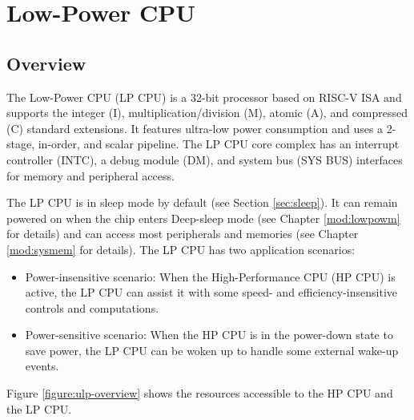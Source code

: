 \documentclass[main\_\_EN.tex]{subfiles}
\begin{document}
\setenglishformatting

\ifglobal
\else
    \clearpage
    \listoftodos
    \listofdonetodos
    \tableofcontents
\fi



\hypertarget{ulp}{}
\chapter{Low-Power CPU}
\label{mod:ulp}

\section{Overview}
\label{sec:ulp-intro}

The \chipname{} Low-Power CPU (LP CPU) is a 32-bit processor based on RISC-V ISA and supports the integer (I), multiplication/division (M), atomic (A), and compressed (C) standard extensions. It features ultra-low power consumption and uses a 2-stage, in-order, and scalar pipeline. The LP CPU core complex has an interrupt controller (INTC), a debug module (DM), and system bus (SYS BUS) interfaces for memory and peripheral access.

The LP CPU is in sleep mode by default (see Section \ref{sec:sleep}). It can remain powered on when the chip enters Deep-sleep mode (see Chapter \ref{mod:lowpowm} \textit{} for details) and can access most peripherals and memories (see Chapter \ref{mod:sysmem} \textit{} for details). The LP CPU has two application scenarios:
\begin{itemize}
    \item Power-insensitive scenario: When the High-Performance CPU (HP CPU) is active, the LP CPU can assist it with some speed- and efficiency-insensitive controls and computations.
    \item Power-sensitive scenario: When the HP CPU is in the power-down state to save power, the LP CPU can be woken up to handle some external wake-up events.
\end{itemize}

Figure \ref{figure:ulp-overview} shows the resources accessible to the HP CPU and the LP CPU.
\end{document}
